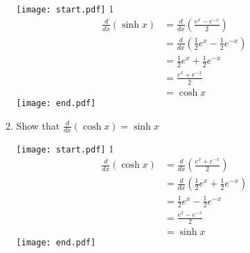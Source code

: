 \documentclass[12pt]{article}
\begin{document}
\begin{enumerate}
\begin{enumerate}
\texttt{[image: start.pdf]}
{{{1\linewidth}{
\begin{align*}
\frac{d}{dx}(\sinh{x}) &= \frac{d}{dx}\left(\frac{e^x-e^{-x}}{2}\right)\\
&=\frac{d}{dx}\left(\frac{1}{2}e^x-\frac{1}{2}e^{-x}\right)\\
&=\frac{1}{2}e^x+\frac{1}{2}e^{-x}\\
&=\frac{e^x+e^{-x}}{2}\\
&=\cosh{x}
\end{align*}
}}}
\texttt{[image: end.pdf]}


\item Show that $\frac{d}{dx}(\cosh{x})=\sinh{x}$

\texttt{[image: start.pdf]}
{{{1\linewidth}{
\begin{align*}
\frac{d}{dx}(\cosh{x}) &= \frac{d}{dx}\left(\frac{e^x+e^{-x}}{2}\right)\\
&=\frac{d}{dx}\left(\frac{1}{2}e^x+\frac{1}{2}e^{-x}\right)\\
&=\frac{1}{2}e^x-\frac{1}{2}e^{-x}\\
&=\frac{e^x-e^{-x}}{2}\\
&=\sinh{x}
\end{align*}
}}}
\texttt{[image: end.pdf]}


\end{enumerate}

\end{enumerate}
\end{document}
